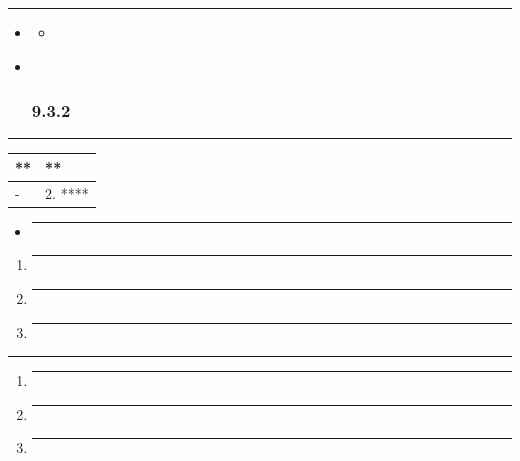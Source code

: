 \begin{center}\rule{0.5\linewidth}{0.5pt}\end{center}

\begin{itemize}
\item
  \begin{itemize}
  \tightlist
  \item
  \end{itemize}
\item ~
  \subsubsection{9.3.2}\label{section-14}
\end{itemize}

\begin{center}\rule{0.5\linewidth}{0.5pt}\end{center}

\begin{longtable}[]{@{}ll@{}}
\toprule\noalign{}
** & ** \\
\midrule\noalign{}
\endhead
\bottomrule\noalign{}
\endlastfoot
- & 2. **** \\
\end{longtable}

\begin{itemize}
\item
  \begin{center}\rule{0.5\linewidth}{0.5pt}\end{center}
\end{itemize}

\begin{enumerate}
\def\labelenumi{\arabic{enumi}.}
\item
  \begin{center}\rule{0.5\linewidth}{0.5pt}\end{center}
\item
  \begin{center}\rule{0.5\linewidth}{0.5pt}\end{center}
\item
  \begin{center}\rule{0.5\linewidth}{0.5pt}\end{center}
\end{enumerate}

\begin{center}\rule{0.5\linewidth}{0.5pt}\end{center}

\begin{enumerate}
\def\labelenumi{\arabic{enumi}.}
\item
  \begin{center}\rule{0.5\linewidth}{0.5pt}\end{center}
\item
  \begin{center}\rule{0.5\linewidth}{0.5pt}\end{center}
\item
  \begin{center}\rule{0.5\linewidth}{0.5pt}\end{center}
\end{enumerate}

